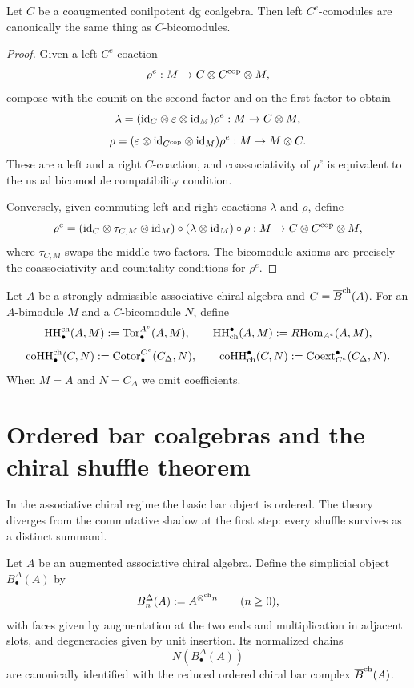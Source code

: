 \begin{lemma}
\label{lem:bicom-e}
Let $C$ be a coaugmented conilpotent dg coalgebra. Then left $C^e$-comodules are canonically the
same thing as $C$-bicomodules.
\end{lemma}

\begin{proof}
Given a left $C^e$-coaction
\[
\rho^e:M\to C\otimes C^{\mathrm{cop}}\otimes M,
\]
compose with the counit on the second factor and on the first factor to obtain
\[
\lambda=(\mathrm{id}_C\otimes \varepsilon\otimes \mathrm{id}_M)\rho^e:M\to C\otimes M,
\]
\[
\rho=(\varepsilon\otimes \mathrm{id}_{C^{\mathrm{cop}}}\otimes \mathrm{id}_M)\rho^e:M\to M\otimes C.
\]
These are a left and a right $C$-coaction, and coassociativity of $\rho^e$ is equivalent to the
usual bicomodule compatibility condition.

Conversely, given commuting left and right coactions $\lambda$ and $\rho$, define
\[
\rho^e
=
(\mathrm{id}_C\otimes \tau_{C,M}\otimes \mathrm{id}_M)\circ(\lambda\otimes \mathrm{id}_M)\circ \rho
:
M\to C\otimes C^{\mathrm{cop}}\otimes M,
\]
where $\tau_{C,M}$ swaps the middle two factors. The bicomodule axioms are precisely the
coassociativity and counitality conditions for $\rho^e$.
\end{proof}

\begin{definition}
Let $A$ be a strongly admissible associative chiral algebra and $C=\overline{B}^{\mathrm{ch}}(A)$.
For an $A$-bimodule $M$ and a $C$-bicomodule $N$, define
\[
\operatorname{HH}^{\mathrm{ch}}_\bullet(A,M):=\operatorname{Tor}_\bullet^{A^e}(A,M),
\qquad
\operatorname{HH}_{\mathrm{ch}}^\bullet(A,M):=R\!\operatorname{Hom}_{A^e}(A,M),
\]
\[
\operatorname{coHH}^{\mathrm{ch}}_\bullet(C,N):=\operatorname{Cotor}_\bullet^{C^e}(C_\Delta,N),
\qquad
\operatorname{coHH}_{\mathrm{ch}}^\bullet(C,N):=\operatorname{Coext}_{C^e}^\bullet(C_\Delta,N).
\]
When $M=A$ and $N=C_\Delta$ we omit coefficients.
\end{definition}

\section{Ordered bar coalgebras and the chiral shuffle theorem}
\label{sec:shuffle}

In the associative chiral regime the basic bar object is ordered.
The theory diverges from the commutative shadow at the first step:
every shuffle survives as a distinct summand.

\begin{definition}
Let $A$ be an augmented associative chiral algebra. Define the simplicial object
$B^\Delta_\bullet(A)$ by
\[
B^\Delta_n(A):=A^{\mathbin{\otimes^{\mathrm{ch}}} n}\qquad (n\geq 0),
\]
with faces given by augmentation at the two ends and multiplication in adjacent slots, and
degeneracies given by unit insertion. Its normalized chains
\[
N(B^\Delta_\bullet(A))
\]
are canonically identified with the reduced ordered chiral bar complex $\overline{B}^{\mathrm{ch}}(A)$.
\end{definition}

